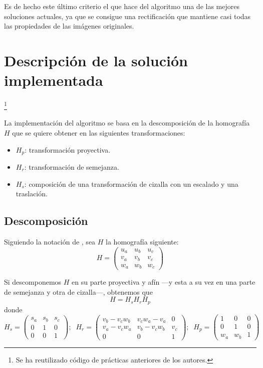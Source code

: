 \documentclass[a4paper, 11pt]{article}
\theoremstyle{definition}
\begin{document}
    Es de hecho este último criterio el que hace del algoritmo una de las mejores soluciones actuales, ya que se consigue una rectificación que mantiene casi todas las propiedades de las imágenes originales.

    \clearpage
    \section{Descripción de la solución implementada}\footnote{Se ha reutilizado código de prácticas anteriores de los autores.}

    La implementación del algoritmo se basa en la descomposición de la homografía $H$ que se quiere obtener en las siguientes transformaciones:
    \begin{itemize}
        \item $H_p$: transformación proyectiva.
        \item $H_r$: transformación de semejanza.
        \item $H_s$: composición de una transformación de cizalla con un escalado y una traslación.
    \end{itemize}

    \subsection{Descomposición}
    Siguiendo la notación de \cite{LoopZhang}, sea $H$ la homografía siguiente:
    \[
    H =
    \begin{pmatrix}
        u_a & u_b & u_c \\
        v_a & v_b & v_c \\
        w_a & w_b & w_c
    \end{pmatrix}
    \]

    Si descomponemos $H$ en su parte proyectiva y afín ---y esta a su vez en una parte de semejanza y otra de cizalla---, obtenemos que
    \[
    H = H_s H_r H_p
    \]
    donde
    \[
    H_s =
    \begin{pmatrix}
        s_a & s_b & s_c \\
        0 & 1 & 0 \\
        0 & 0 & 1
    \end{pmatrix};\;\;
    H_r =
    \begin{pmatrix}
        v_b - v_c w_b & v_c w_a - v_a & 0 \\
        v_a - v_c w_a & v_b - v_c w_b & v_c \\
        0 & 0 & 1
    \end{pmatrix};\;\;
    H_p =
    \begin{pmatrix}
        1 & 0 & 0 \\
        0 & 1 & 0 \\
        w_a & w_b & 1
    \end{pmatrix}
    \]
\end{document}
